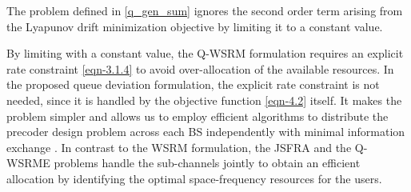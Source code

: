 The problem defined in \eqref{q_gen_sum} ignores the second order term arising from the Lyapunov drift minimization objective by limiting it to a constant value. 

By limiting  with a constant value, the \ac{Q-WSRM} formulation requires an explicit rate constraint \eqref{eqn-3.1.4} to avoid over-allocation of the available resources. In the proposed queue deviation formulation, the explicit rate constraint is not needed, since it is handled by the objective function \eqref{eqn-4.2} itself. It makes the problem simpler and allows us to employ efficient algorithms to distribute the precoder design problem across each \ac{BS} independently with minimal information exchange \cite{boyd2011distributed}. In contrast to the \ac{WSRM} formulation, the \ac{JSFRA} and the \ac{Q-WSRME} problems handle the sub-channels jointly to obtain an efficient allocation by identifying the optimal space-frequency resources for the users.
